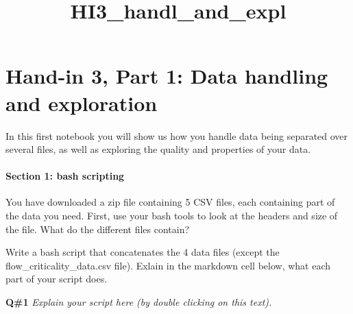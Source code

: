 \documentclass[11pt]{article}
\title{HI3\_handl\_and\_expl}
\begin{document}
    
    
    \maketitle
    
    

    
    \section{Hand-in 3, Part 1: Data handling and
exploration}\label{hand-in-3-part-1-data-handling-and-exploration}

In this first notebook you will show us how you handle data being
separated over several files, as well as exploring the quality and
properties of your data.

    \paragraph{Section 1: bash scripting}\label{section-1-bash-scripting}

You have downloaded a zip file containing 5 CSV files, each containing
part of the data you need. First, use your bash tools to look at the
headers and size of the file. What do the different files contain?

Write a bash script that concatenates the 4 data files (except the
flow\_criticality\_data.csv file). Exlain in the markdown cell below,
what each part of your script does.

    \textbf{Q\#1} \emph{Explain your script here (by double clicking on this
text).}
\end{document}
